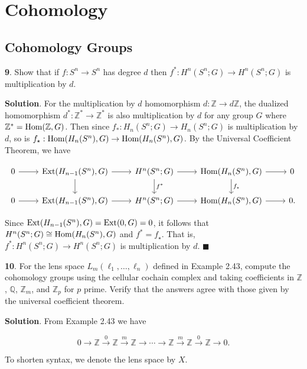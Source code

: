 \documentclass{article}
\newcommand{\Z}{\mathbb{Z}}
\newcommand{\Q}{\mathbb{Q}}
\newcommand{\Hom}{\textnormal{Hom}}
\newcommand{\Ext}{\textnormal{Ext}}
\begin{document}
\newpage

\section{Cohomology}

\subsection{Cohomology Groups}

\tab \textbf{9}. Show that if $f:S^{n}\to S^{n}$ has degree $d$ then $f^{\ast}: H^{n}(S^{n};G)\to H^{n}(S^{n};G)$ is multiplication by $d$.
\medskip

\textbf{Solution}. For the multiplication by $d$ homomorphism $d: \Z\to d\Z$, the dualized homomorphism $d^{\ast}:\Z^{\ast}\to \Z^{\ast}$ is also multiplication by $d$ for any group $G$ where $\Z^{\ast} = \Hom(\Z, G)$. Then since $f_{\ast}:H_{n}(S^{n};G)\to H_{n}(S^{n};G)$ is multiplication by $d$, so is $f_{\star}:\Hom(H_{n}(S^{n}), G)\to \Hom(H_{n}(S^{n}), G)$. By the Universal Coefficient Theorem, we have

\[\begin{tikzcd}
0 \arrow{r} & \Ext(H_{n-1}(S^{n}), G) \arrow{r} \arrow{d} & H^{n}(S^{n};G) \arrow{r} \arrow{d}{f^{\ast}} & \Hom(H_{n}(S^{n}), G) \arrow{r} \arrow{d}{f_{\star}} & 0\\
0 \arrow{r} & \Ext(H_{n-1}(S^{n}), G) \arrow{r} & H^{n}(S^{n};G) \arrow{r} & \Hom(H_{n}(S^{n}), G) \arrow{r} & 0.
\end{tikzcd}\]
\medskip

Since $\Ext(H_{n-1}(S^{n}), G) = \Ext(0, G) = 0$, it follows that $H^{n}(S^{n};G)\cong \Hom(H_{n}(S^{n}), G)$ and $f^{\ast} = f_{\star}$. That is, $f^{\ast}:H^{n}(S^{n};G)\to H^{n}(S^{n};G)$ is multiplication by $d$. $\blacksquare$
\bigskip
\bigskip

\textbf{10}. For the lens space $L_{m}(\ell_{1}, \ldots, \ell_{n})$ defined in Example 2.43, compute the cohomology groups using the cellular cochain complex and taking coefficients in $\Z$, $\Q$, $\Z_{m}$, and $\Z_{p}$ for $p$ prime. Verify that the answers agree with those given by the universal coefficient theorem.
\medskip

\textbf{Solution}. From Example 2.43 we have

$$0\to \Z\xrightarrow{0} \Z\xrightarrow{m} \Z\to \cdots \to \Z \xrightarrow{m}\Z \xrightarrow{0}\Z\to 0.$$

To shorten syntax, we denote the lens space by $X$.
\bigskip
\end{document}
